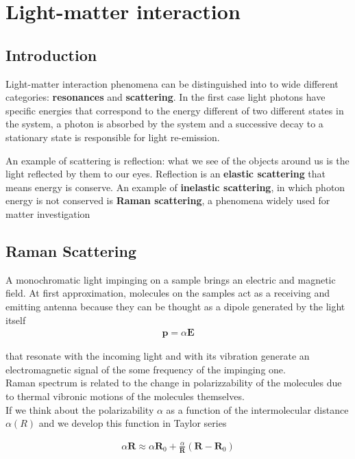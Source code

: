 
\chapter{Light-matter interaction} %

\section{Introduction}

Light-matter interaction phenomena can be distinguished into to wide different categories: {\bf resonances} and {\bf scattering}. In the first case light photons have specific energies that correspond to the energy different of two different states in the system, a photon is absorbed by the system and a successive decay to a stationary state is responsible for light re-emission.

An example of scattering is reflection: what we see of the objects around us is the light reflected by them to our eyes. Reflection is an {\bf elastic scattering} that means energy is conserve. An example of {\bf inelastic scattering}, in which photon energy is not conserved is {\bf Raman scattering}, a phenomena widely used for matter investigation


\section{Raman Scattering}

A monochromatic light impinging on a sample brings an electric and magnetic field. At first approximation, molecules on the samples act as a receiving and emitting antenna because they can be thought as a dipole generated by the light itself
\begin{eqnarray}
	\mathbf{p} = \alpha \mathbf{E}
\end{eqnarray}


that resonate with the incoming light and with its vibration generate an electromagnetic signal of the some frequency of the impinging one.\\
Raman spectrum is related to the change in polarizzability of the molecules due to thermal vibronic motions of the molecules themselves.\\
If we think about the polarizability $\alpha$ as a function of the intermolecular distance $\alpha(R)$ and we develop this function in Taylor series

\begin{eqnarray}
	\alpha{\mathbf{R}} \approx \alpha{\mathbf{R}_0} + \frac{\alpha}{\mathbf{R}} \left( \mathbf{R} - \mathbf{R}_0 \right)
\end{eqnarray}


